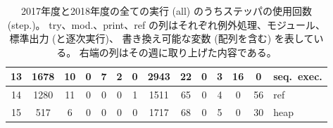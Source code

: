 \begin{table}[h]
\begin{center}
\begin{tabular}{|c||c|c|c|c|c|c||c|c|c|c|c|c||l|}
    13 & 1678 & 10 & 0 & 7 & 2 & 0 & 2943 & 22 & 0 & 3 & 16 & 0 & seq.\ exec.\\ \hline
    14 & 1280 & 11 & 0 & 0 & 0 & 1 & 1511 & 65 & 0 & 4 & 0 & 56 & ref\\ \hline
    15 & 517 & 6 & 0 & 0 & 0 & 0 & 1717 & 68 & 0 & 5 & 0 & 30 & heap\\ \hline
  \end{tabular}
\end{center}
  \caption[ステッパが使用された回数]{
    2017年度と2018年度の全ての実行 (all) のうちステッパの使用回数 (step.)。
    try、mod.、print、ref の列はそれぞれ例外処理、モジュール、標準出力 (と逐次実行)、
    書き換え可能な変数 (配列を含む) を表している。
    右端の列はその週に取り上げた内容である。
  }
  \label{TableUsage}
\end{table}

